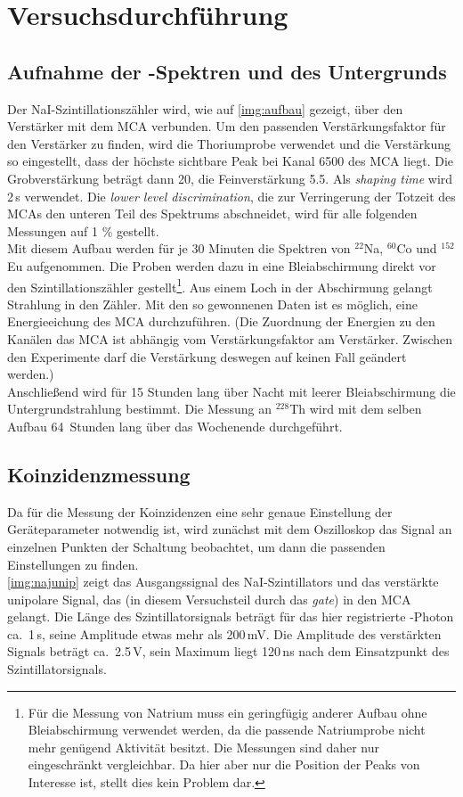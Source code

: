 \section{Versuchsdurchführung}

\subsection{Aufnahme der \textgamma-Spektren und des Untergrunds}
Der NaI-Szintillationszähler wird, wie auf \autoref{img:aufbau} gezeigt, über den Verstärker mit
dem MCA verbunden.
Um den passenden Verstärkungsfaktor für den Verstärker zu finden, wird die Thoriumprobe verwendet
und die Verstärkung so eingestellt, dass der höchste sichtbare Peak bei Kanal 6500 des MCA liegt.
Die Grobverstärkung beträgt dann 20, die Feinverstärkung 5.5. Als \emph{shaping time} wird 2\,\textmu s verwendet.
Die \emph{lower level discrimination}, die zur Verringerung der Totzeit des MCAs den unteren Teil des
Spektrums abschneidet, wird für alle folgenden Messungen auf 1 \% gestellt.\\
Mit diesem Aufbau werden für je 30 Minuten die Spektren von ${}^{22}$Na, ${}^{60}$Co und ${}^{152}$Eu aufgenommen.
Die Proben werden dazu in eine Bleiabschirmung direkt vor den Szintillationszähler gestellt\footnote{Für die
Messung von Natrium muss ein geringfügig anderer Aufbau ohne Bleiabschirmung verwendet werden,
da die passende Natriumprobe nicht mehr genügend Aktivität besitzt.
Die Messungen sind daher nur eingeschränkt vergleichbar.
Da hier aber nur die Position der Peaks von Interesse ist, stellt dies kein Problem dar.}.
Aus einem Loch in der Abschirmung gelangt Strahlung in den Zähler.
Mit den so gewonnenen Daten ist es möglich, eine Energieeichung des MCA durchzuführen.
(Die Zuordnung der Energien zu den Kanälen das MCA ist abhängig vom  Verstärkungsfaktor am Verstärker.
Zwischen den Experimente darf die Verstärkung deswegen auf keinen Fall geändert werden.)\\
Anschließend wird für 15 Stunden lang über Nacht mit leerer Bleiabschirmung die Untergrundstrahlung bestimmt.
Die Messung an ${}^{228}$Th wird mit dem selben Aufbau 64~Stunden lang über das Wochenende durchgeführt.



\subsection{Koinzidenzmessung}

Da für die Messung der Koinzidenzen eine sehr genaue Einstellung der Geräteparameter notwendig ist,
wird zunächst mit dem Oszilloskop das Signal an einzelnen Punkten der Schaltung beobachtet,
um dann die passenden Einstellungen zu finden.\\
\autoref{img:najunip} zeigt das Ausgangssignal des NaI-Szintillators und das verstärkte unipolare Signal,
das (in diesem Versuchsteil durch das \emph{gate}) in den MCA gelangt.
Die Länge des Szintillatorsignals beträgt für das hier registrierte \textgamma-Photon ca.~1\,\textmu s,
seine Amplitude etwas mehr als 200\,mV.
Die Amplitude des verstärkten Signals beträgt ca.~2.5\,V,
sein Maximum liegt 120\,ns nach dem Einsatzpunkt des Szintillatorsignals.

